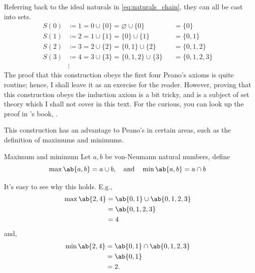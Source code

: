 Referring back to the ideal naturals in \cref{eq:naturals_chain}, they can all be cast into sets.
\begin{equation}
  \begin{aligned}
    S(0) & \coloneqq 1 = 0 \cup \{0\} = \varnothing \cup \{0\} &  & = \{0\}          \\
    S(1) & \coloneqq 2 = 1 \cup \{1\} = \{0\} \cup \{1\}       &  & = \{0, 1\}       \\
    S(2) & \coloneqq 3 = 2 \cup \{2\} = \{0, 1\} \cup \{2\}    &  & = \{0, 1, 2\}    \\
    S(3) & \coloneqq 4 = 3 \cup \{3\} = \{0, 1, 2\} \cup \{3\} &  & = \{0, 1, 2, 3\} \\
         & \vdots
  \end{aligned}
\end{equation}
The proof that this construction obeys the first four Peano's axioms is quite routine; hence, I
shall leave it as an exercise for the reader. However, proving that this construction obeys the
induction axiom is a bit tricky, and is a subject of set theory which I shall not cover in this
text. For the curious, you can look up the proof in \citeauthor{goldrei-1996}'s book,
 \cite{goldrei-1996}.

This construction has an advantage to Peano's in certain areas, such as the definition of maximums
and minimums.

\begin{df}{Maximum and minimum}{}
  Let \(a, b\) be von-Neumann natural numbers, define
  \begin{equation}
    \max \ab\{a, b\} = a \cup b, \mathand \min \ab\{a, b\} = a \cap b
  \end{equation}
\end{df}

It's easy to see why this holds. E.g.,
\begin{align}
  \max \ab\{2, 4\} & = \ab\{0, 1\} \cup \ab\{0, 1, 2, 3\} \\
                   & = \ab\{0, 1, 2, 3\}                  \\
                   & = 4
\end{align}
and,
\begin{align}
  \min \ab\{2, 4\} & = \ab\{0, 1\} \cap \ab\{0, 1, 2, 3\} \\
                   & = \ab\{0, 1\}                        \\
                   & = 2.
\end{align}

